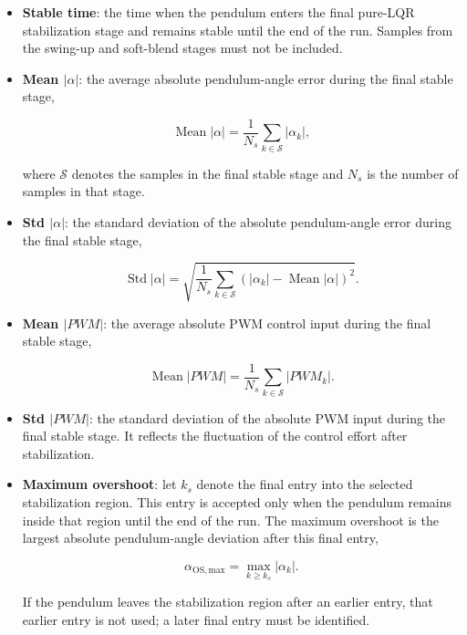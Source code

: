 \documentclass[11pt,a4paper]{article}
\begin{document}
\begin{itemize}

    \item \textbf{Stable time}: the time when the pendulum enters the final
    pure-LQR stabilization stage and remains stable until the end of the run.
    Samples from the swing-up and soft-blend stages must not be included.

    \item \textbf{Mean $|\alpha|$}: the average absolute pendulum-angle error
    during the final stable stage,

    \[
    \operatorname{Mean}|\alpha|
    =
    \frac{1}{N_s}
    \sum_{k\in\mathcal{S}}|\alpha_k|,
    \]

    where $\mathcal{S}$ denotes the samples in the final stable stage and
    $N_s$ is the number of samples in that stage.

    \item \textbf{Std $|\alpha|$}: the standard deviation of the absolute
    pendulum-angle error during the final stable stage,

    \[
    \operatorname{Std}|\alpha|
    =
    \sqrt{
    \frac{1}{N_s}
    \sum_{k\in\mathcal{S}}
    \left(
    |\alpha_k|-\operatorname{Mean}|\alpha|
    \right)^2
    }.
    \]

    \item \textbf{Mean $|PWM|$}: the average absolute PWM control input during
    the final stable stage,

    \[
    \operatorname{Mean}|PWM|
    =
    \frac{1}{N_s}
    \sum_{k\in\mathcal{S}}|PWM_k|.
    \]

    \item \textbf{Std $|PWM|$}: the standard deviation of the absolute PWM
    input during the final stable stage. It reflects the fluctuation of the
    control effort after stabilization.

    \item \textbf{Maximum overshoot}: let $k_s$ denote the final entry
    into the selected stabilization region. This entry is accepted only when
    the pendulum remains inside that region until the end of the run. The
    maximum overshoot is the largest absolute pendulum-angle deviation after
    this final entry,

    \[
    \alpha_{\mathrm{OS,max}}
    =
    \max_{k\geq k_s}|\alpha_k|.
    \]

    If the pendulum leaves the stabilization region after an earlier entry,
    that earlier entry is not used; a later final entry must be identified.

\end{itemize}
\end{document}
